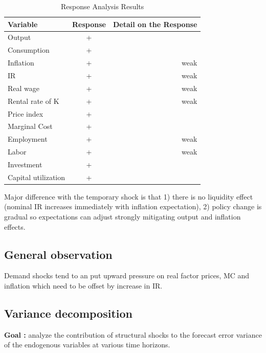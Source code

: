 \documentclass{article}
\begin{document}
\begin{table}[H]    
    \centering  
    \begin{threeparttable}    
    \caption{Response Analysis Results}    
    \label{tab:response_analysis}    
    \begin{tabular}{lcr}    
        \toprule    
        \textbf{Variable} & \textbf{Response} & \textbf{Detail on the Response} \\    
        \midrule    
        Output & + &   \\    
        Consumption & + & \\ 
        Inflation & + & weak \\
        IR & + & weak\\   
        Real wage & + & weak \\  
        Rental rate of K & + & weak \\
        Price index & + & \\
        Marginal Cost & + &  \\
        Employment & + & weak  \\   
        Labor & + & weak \\
        Investment & + & \\
        Capital utilization & + & \\
        \bottomrule    
    \end{tabular}  
    \begin{tablenotes}  
        \small  
        \item Major difference with the temporary shock is that 1) there is no liquidity effect (nominal IR increases immediately with inflation expectation), 2) policy change is gradual so expectations can adjust strongly mitigating output and inflation effects. 
    \end{tablenotes}  
    \end{threeparttable}    
\end{table} 

\subsection{General observation}
Demand shocks tend to an put upward pressure on real factor prices, MC and inflation which need to be offset by increase in IR. 

\subsection{Variance decomposition}
\textbf{Goal :} analyze the contribution of structural shocks to the forecast error variance of the endogenous variables at various time horizons. 
\end{document}
